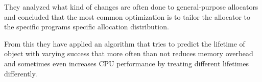 They analyzed what kind of changes are often done to general-purpose allocators and concluded that the most common optimization is to tailor the allocator to the specific programs specific allocation distribution. 

From this they have applied an algorithm that tries to predict the lifetime of object with varying success that more often than not reduces memory overhead and sometimes even increases CPU performance by treating different lifetimes differently.


